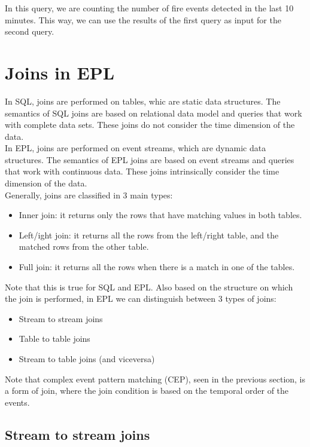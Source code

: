 In this query, we are counting the number of fire events detected in the last
10 minutes. This way, we can use the results of the first query as input for the
second query.


\section{Joins in EPL}

In SQL, joins are performed on tables, whic are static data structures. The semantics
of SQL joins are based on relational data model and queries that work with complete 
data sets. These joins do not consider the time dimension of the data.\\

In EPL, joins are performed on event streams, which are dynamic data structures. The
semantics of EPL joins are based on event streams and queries that work with continuous
data. These joins intrinsically consider the time dimension of the data.\\

Generally, joins are classified in 3 main types:

\begin{itemize}
    \item Inner join: it returns only the rows that have matching values in both tables.
    \item Left/ight join: it returns all the rows from the left/right table, and the matched rows from the other table.
    \item Full join: it returns all the rows when there is a match in one of the tables.
\end{itemize}

Note that this is true for SQL and EPL. Also based on the structure on which the join is 
performed, in EPL we can distinguish between 3 types of joins:

\begin{itemize}
    \item Stream to stream joins
    \item Table to table joins
    \item Stream to table joins (and viceversa)
\end{itemize}

Note that complex event pattern matching (CEP), seen in the previous section, is a form of join, 
where the join condition is based on the temporal order of the events.

\subsection{Stream to stream joins}

